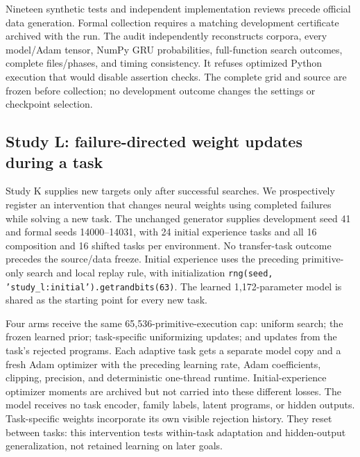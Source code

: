 \documentclass[11pt]{article}
\begin{document}
Nineteen synthetic tests and independent implementation reviews precede
official data generation. Formal collection requires a matching development
certificate archived with the run. The audit independently reconstructs
corpora, every model/Adam tensor, NumPy GRU probabilities, full-function
search outcomes, complete files/phases, and timing consistency. It refuses
optimized Python execution that would disable assertion checks. The complete
grid and source are frozen before collection; no development outcome changes
the settings or checkpoint selection.

\subsection{Study L: failure-directed weight updates during a task}
Study K supplies new targets only after successful searches. We prospectively register
an intervention that changes neural weights using completed failures while
solving a new task. The unchanged generator supplies development seed 41 and
formal seeds 14000--14031, with 24 initial experience tasks and all 16
composition and 16 shifted tasks per environment. No transfer-task outcome
precedes the source/data freeze. Initial experience uses the preceding
primitive-only search and local replay rule, with initialization
\texttt{rng(seed, 'study\_l:initial').getrandbits(63)}. The learned 1,172-parameter model is
shared as the starting point for every new task.

Four arms receive the same 65,536-primitive-execution cap: uniform search;
the frozen learned prior; task-specific uniformizing updates; and updates
from the task's rejected programs. Each adaptive task gets a separate model
copy and a fresh Adam optimizer with the preceding learning rate, Adam coefficients,
clipping, precision, and deterministic one-thread runtime. Initial-experience
optimizer moments are archived but not carried into these different losses.
The model receives no task encoder, family labels, latent programs, or hidden
outputs. Task-specific weights incorporate its own visible rejection history.
They reset between tasks: this intervention tests within-task adaptation and
hidden-output generalization, not retained learning on later goals.
\end{document}
